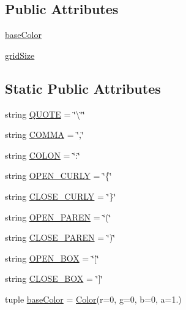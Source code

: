 \subsection*{Public Attributes}
\begin{DoxyCompactItemize}
\item 
\hyperlink{classbridges_1_1color__grid_1_1_color_grid_ad2db62703be80114e46b490ff02f8bd9}{base\+Color}
\item 
\hyperlink{classbridges_1_1color__grid_1_1_color_grid_a1144d58ebd7578e47e5a8746f82ef2c4}{grid\+Size}
\end{DoxyCompactItemize}
\subsection*{Static Public Attributes}
\begin{DoxyCompactItemize}
\item 
string \hyperlink{classbridges_1_1color__grid_1_1_color_grid_aa04754ccd3208b64eb3ad7b13e4b0315}{Q\+U\+O\+T\+E} = \char`\"{}\textbackslash{}\char`\"{}\char`\"{}
\item 
string \hyperlink{classbridges_1_1color__grid_1_1_color_grid_a2d8833a66352ef424427cbf0b37a546c}{C\+O\+M\+M\+A} = \char`\"{},\char`\"{}
\item 
string \hyperlink{classbridges_1_1color__grid_1_1_color_grid_af86e0c070a2e69d3801d261b1e0e1e43}{C\+O\+L\+O\+N} = \char`\"{}\+:\char`\"{}
\item 
string \hyperlink{classbridges_1_1color__grid_1_1_color_grid_a72d74aa84fe5e8933077797f02c6f025}{O\+P\+E\+N\+\_\+\+C\+U\+R\+L\+Y} = \char`\"{}\{\char`\"{}
\item 
string \hyperlink{classbridges_1_1color__grid_1_1_color_grid_a8b8c765951276669e7174f57b6e6a297}{C\+L\+O\+S\+E\+\_\+\+C\+U\+R\+L\+Y} = \char`\"{}\}\char`\"{}
\item 
string \hyperlink{classbridges_1_1color__grid_1_1_color_grid_aa9cf473f9df8ec2e9b885d830cad1b11}{O\+P\+E\+N\+\_\+\+P\+A\+R\+E\+N} = \char`\"{}(\char`\"{}
\item 
string \hyperlink{classbridges_1_1color__grid_1_1_color_grid_a7f9e5efe3764e44eb2ae67cfb3ed3ab0}{C\+L\+O\+S\+E\+\_\+\+P\+A\+R\+E\+N} = \char`\"{})\char`\"{}
\item 
string \hyperlink{classbridges_1_1color__grid_1_1_color_grid_a61b53ebe64497c9da17d09b70f984ffc}{O\+P\+E\+N\+\_\+\+B\+O\+X} = \char`\"{}\mbox{[}\char`\"{}
\item 
string \hyperlink{classbridges_1_1color__grid_1_1_color_grid_a15c83f2af647ad43478ab0aa9a15c220}{C\+L\+O\+S\+E\+\_\+\+B\+O\+X} = \char`\"{}\mbox{]}\char`\"{}
\item 
tuple \hyperlink{classbridges_1_1color__grid_1_1_color_grid_a0e4072c513a5a641f9713b49c72db36c}{base\+Color} = \hyperlink{classbridges_1_1color_1_1_color}{Color}(r=0, g=0, b=0, a=1.)
\end{DoxyCompactItemize}


